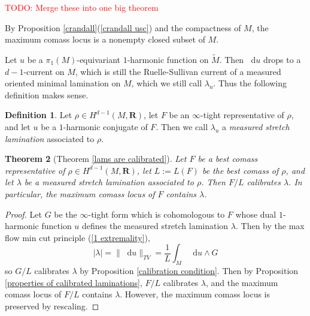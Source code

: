 \documentclass[reqno,11pt]{amsart}
\newcommand{\RR}{\mathbf{R}}
\newcommand*\dif{\mathop{}\!\mathrm{d}}
\newcommand{\dfn}[1]{\emph{#1}\index{#1}}
\newtheorem{theorem}{Theorem}[section]
\theoremstyle{definition}
\newtheorem{definition}[theorem]{Definition}
\numberwithin{equation}{section}
\newcommand\todo[1]{\textcolor{red}{TODO: #1}}
\begin{document}
\todo{Merge these into one big theorem}

By Proposition \ref{crandall}(\ref{crandall usc}) and the compactness of $M$, the maximum comass locus is a nonempty closed subset of $M$.

Let $u$ be a $\pi_1(M)$-equivariant $1$-harmonic function on $\tilde M$.
Then $\dif u$ drops to a $d-1$-current on $M$, which is still the Ruelle-Sullivan current of a measured oriented minimal lamination on $M$, which we still call $\lambda_u$.
Thus the following definition makes sense.

\begin{definition}
Let $\rho \in H^{d - 1}(M, \RR)$, let $F$ be an $\infty$-tight representative of $\rho$, and let $u$ be a $1$-harmonic conjugate of $F$.
Then we call $\lambda_u$ a \dfn{measured stretch lamination} associated to $\rho$.
\end{definition}

\begin{theorem}[Theorem \ref{lams are calibrated}]\label{MCL contains Thurston}
Let $F$ be a best comass representative of $\rho \in H^{d - 1}(M, \RR)$, let $L := L(F)$ be the best comass of $\rho$, and let $\lambda$ be a measured stretch lamination associated to $\rho$.
Then $F/L$ calibrates $\lambda$. In particular, the maximum comass locus of $F$ contains $\lambda$.
\end{theorem}
\begin{proof}
Let $G$ be the $\infty$-tight form which is cohomologous to $F$ whose dual $1$-harmonic function $u$ defines the measured stretch lamination $\lambda$.
Then by the max flow min cut principle (\ref{1 extremality}), 
$$|\lambda| = \|\dif u\|_{TV} = \frac{1}{L} \int_M \dif u \wedge G$$
so $G/L$ calibrates $\lambda$ by Proposition \ref{calibration condition}.
Then by Proposition \ref{properties of calibrated laminations}, $F/L$ calibrates $\lambda$, and the maximum comass locus of $F/L$ contains $\lambda$.
However, the maximum comass locus is preserved by rescaling.
\end{proof}
\end{document}
